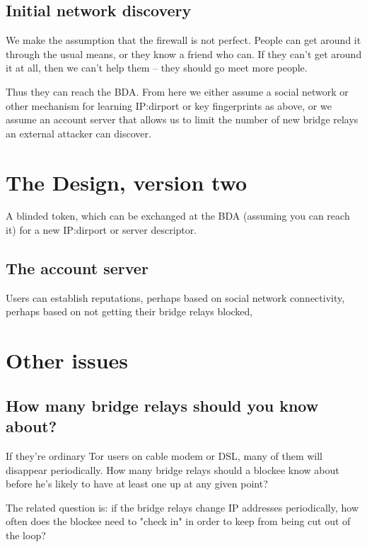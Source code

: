 \documentclass{llncs}
\begin{document}
\subsection{Initial network discovery}

We make the assumption that the firewall is not perfect. People can
get around it through the usual means, or they know a friend who can.
If they can't get around it at all, then we can't help them -- they
should go meet more people.

Thus they can reach the BDA. From here we either assume a social
network or other mechanism for learning IP:dirport or key fingerprints
as above, or we assume an account server that allows us to limit the
number of new bridge relays an external attacker can discover.



\section{The Design, version two}

\item A blinded token, which can be exchanged at the BDA (assuming you
can reach it) for a new IP:dirport or server descriptor.

\subsection{The account server}

Users can establish reputations, perhaps based on social network
connectivity, perhaps based on not getting their bridge relays blocked,



\section{Other issues}

\subsection{How many bridge relays should you know about?}

If they're ordinary Tor users on cable modem or DSL, many of them will
disappear periodically. How many bridge relays should a blockee know
about before he's likely to have at least one up at any given point?

The related question is: if the bridge relays change IP addresses
periodically, how often does the blockee need to "check in" in order
to keep from being cut out of the loop?
\end{document}
